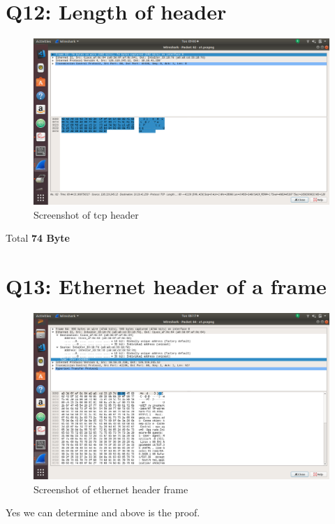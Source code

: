 \documentclass{article}
\begin{document}
\section{Q12: Length of header}
 \begin{figure}[H]
 \centering
 \includegraphics[width=1.0\textwidth]{../q12/a.png}
 \caption{\label{fig:PING}Screenshot of tcp header}
 \end{figure}
 

Total \textbf{74 Byte}
 
\section{Q13: Ethernet header of a frame}
 \begin{figure}[H]
 \centering
 \includegraphics[width=1.0\textwidth]{../q13/a.png}
 \caption{\label{fig:PING}Screenshot of ethernet header frame}
 \end{figure}
 
 Yes we can determine and above is the proof.
 
 
\end{document}
